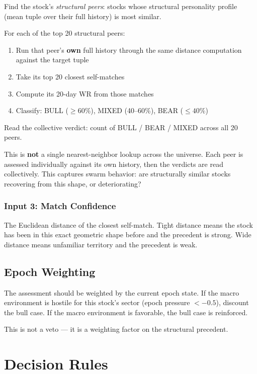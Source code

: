 \documentclass[11pt, a4paper]{article}
\begin{document}
Find the stock's \emph{structural peers}: stocks whose structural personality
profile (mean tuple over their full history) is most similar.

For each of the top 20 structural peers:
\begin{enumerate}
  \item Run that peer's \textbf{own} full history through the same distance
        computation against the target tuple
  \item Take its top 20 closest self-matches
  \item Compute its 20-day WR from those matches
  \item Classify: BULL ($\geq 60\%$), MIXED (40--60\%), BEAR ($\leq 40\%$)
\end{enumerate}

Read the collective verdict: count of BULL / BEAR / MIXED across all 20 peers.

This is \textbf{not} a single nearest-neighbor lookup across the universe.
Each peer is assessed individually against its own history, then the verdicts
are read collectively. This captures swarm behavior: are structurally similar
stocks recovering from this shape, or deteriorating?

\subsubsection{Input 3: Match Confidence}

The Euclidean distance of the closest self-match. Tight distance means the
stock has been in this exact geometric shape before and the precedent is
strong. Wide distance means unfamiliar territory and the precedent is weak.

\subsection{Epoch Weighting}

The assessment should be weighted by the current epoch state. If the macro
environment is hostile for this stock's sector (epoch pressure $< -0.5$),
discount the bull case. If the macro environment is favorable, the bull
case is reinforced.

This is not a veto --- it is a weighting factor on the structural precedent.

\section{Decision Rules}
\end{document}

